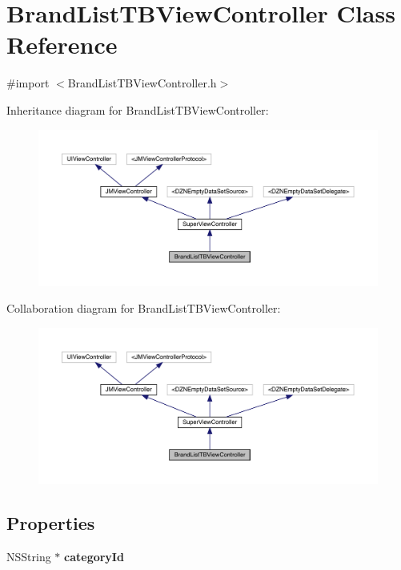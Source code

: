 \hypertarget{interface_brand_list_t_b_view_controller}{}\section{Brand\+List\+T\+B\+View\+Controller Class Reference}
\label{interface_brand_list_t_b_view_controller}


{\ttfamily \#import $<$Brand\+List\+T\+B\+View\+Controller.\+h$>$}



Inheritance diagram for Brand\+List\+T\+B\+View\+Controller\+:\nopagebreak
\begin{figure}[H]
\begin{center}
\leavevmode
\includegraphics[width=350pt]{interface_brand_list_t_b_view_controller__inherit__graph}
\end{center}
\end{figure}


Collaboration diagram for Brand\+List\+T\+B\+View\+Controller\+:\nopagebreak
\begin{figure}[H]
\begin{center}
\leavevmode
\includegraphics[width=350pt]{interface_brand_list_t_b_view_controller__coll__graph}
\end{center}
\end{figure}
\subsection*{Properties}
\begin{DoxyCompactItemize}
\item 
\mbox{\label{interface_brand_list_t_b_view_controller_ac06280d5aa9b44290630c49771ef6681}} 
N\+S\+String $\ast$ {\bfseries category\+Id}
\end{DoxyCompactItemize}
